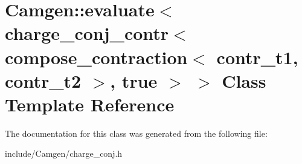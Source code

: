 \hypertarget{a00141}{\section{Camgen\-:\-:evaluate$<$ charge\-\_\-conj\-\_\-contr$<$ compose\-\_\-contraction$<$ contr\-\_\-t1, contr\-\_\-t2 $>$, true $>$ $>$ Class Template Reference}
\label{a00141}
}


The documentation for this class was generated from the following file\-:\begin{DoxyCompactItemize}
\item 
include/\-Camgen/charge\-\_\-conj.\-h\end{DoxyCompactItemize}
